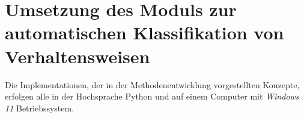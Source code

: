\chapter{Umsetzung des Moduls zur automatischen Klassifikation von Verhaltensweisen} \label{chap:Umsetzung}
Die Implementationen, der in der Methodenentwicklung vorgestellten Konzepte, erfolgen alle in der Hochsprache \gls{Python} und auf einem Computer mit \textit{Windows 11} Betriebssystem. 




